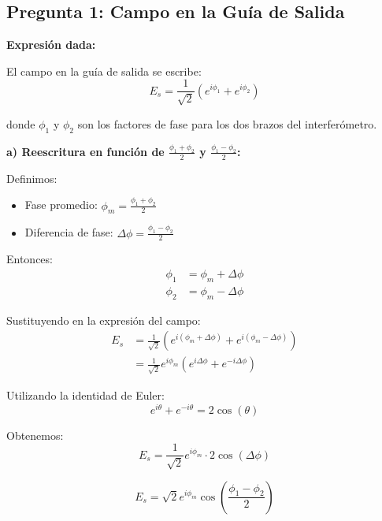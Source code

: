 \documentclass[12pt,a4paper]{article}
\begin{document}
\subsection{Pregunta 1: Campo en la Guía de Salida}

\textbf{Expresión dada:}

El campo en la guía de salida se escribe:
\begin{equation}
    E_s = \frac{1}{\sqrt{2}} \left( e^{i\phi_1} + e^{i\phi_2} \right)
\end{equation}

donde $\phi_1$ y $\phi_2$ son los factores de fase para los dos brazos del interferómetro.

\textbf{a) Reescritura en función de $\frac{\phi_1 + \phi_2}{2}$ y $\frac{\phi_1 - \phi_2}{2}$:}

Definimos:
\begin{itemize}
    \item Fase promedio: $\phi_m = \frac{\phi_1 + \phi_2}{2}$
    \item Diferencia de fase: $\Delta\phi = \frac{\phi_1 - \phi_2}{2}$
\end{itemize}

Entonces:
\begin{align}
    \phi_1 &= \phi_m + \Delta\phi \\
    \phi_2 &= \phi_m - \Delta\phi
\end{align}

Sustituyendo en la expresión del campo:
\begin{align}
    E_s &= \frac{1}{\sqrt{2}} \left( e^{i(\phi_m + \Delta\phi)} + e^{i(\phi_m - \Delta\phi)} \right) \\
    &= \frac{1}{\sqrt{2}} e^{i\phi_m} \left( e^{i\Delta\phi} + e^{-i\Delta\phi} \right)
\end{align}

Utilizando la identidad de Euler:
\begin{equation}
    e^{i\theta} + e^{-i\theta} = 2\cos(\theta)
\end{equation}

Obtenemos:
\begin{equation}
    E_s = \frac{1}{\sqrt{2}} e^{i\phi_m} \cdot 2\cos(\Delta\phi)
\end{equation}

\begin{equation}
    \boxed{E_s = \sqrt{2} e^{i\phi_m} \cos\left(\frac{\phi_1 - \phi_2}{2}\right)}
\end{equation}
\end{document}

